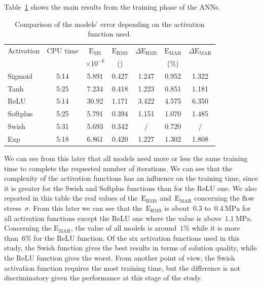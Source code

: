\documentclass[algorithms,article,submit,pdftex,oneauthors]{Definitions/mdpi}
\DeclareRobustCommand{\MSE}{\text{E}_\text{MS}}
\DeclareRobustCommand{\RMSE}{\text{E}_\text{RMS}}
\DeclareRobustCommand{\MARE}{\text{E}_\text{MAR}}
\DeclareRobustCommand{\MPa}{\text{MPa}}
\begin{document}
Table~\ref{tab:Training} shows the main results from the training phase of the ANNs.
\begin{table}[h]
\caption{Comparison of the models' error depending on the activation function used.\label{tab:Training}}
\begin{tabular}{lcccccc}
\toprule
Activation & CPU time & $\MSE$ & $\RMSE$ & $\Delta\RMSE$ & $\MARE$ & $\Delta\MARE$ \\
 & & $\times 10^{-6}$ & (\MPa) & & (\%) &\\ \midrule
Sigmoid & 5:14 & 5.891 & 0.427 & 1.247 & 0.952 & 1.322\\
Tanh & 5:25 & 7.234 & 0.418 & 1.223 & 0.851 & 1.181\\
ReLU & 5:14 & 30.92 & 1.171 & 3.422 & 4.575 & 6.350\\
Softplus & 5:25 & 5.791 & 0.394 & 1.151 & 1.070 & 1.485\\
Swish & 5:31 & 5.693 & 0.342 & / &0.720 & / \\
Exp & 5:18 & 6.861 & 0.420 & 1.227 & 1.302 & 1.808\\
\bottomrule
\end{tabular}
\end{table}
We can see from this later that all models need more or less the same training time to complete the requested number of iterations.
We can see that the complexity of the activation functions has an influence on the training time, since it is greater for the Swish and Softplus functions than for the ReLU one.
We also reported in this table the real values of the~$\RMSE$ and~$\MARE$ concerning the flow stress~$\sigma$.
From this later we can see that the~$\RMSE$ is about~$0.3$ to~$0.4~\MPa$ for all activation functions except the ReLU one where the value is above~$1.1~\MPa$.
Concerning the $\MARE$, the value of all models is around~$1\%$ while it is more than~$6\%$ for the ReLU function.
Of the six activation functions used in this study, the Swish function gives the best results in terms of solution quality, while the ReLU function gives the worst.
From another point of view, the Swish activation function requires the most training time, but the difference is not discriminatory given the performance at this stage of the study.
\end{document}
